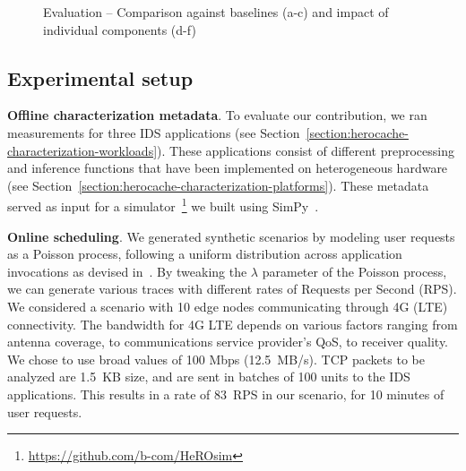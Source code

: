 \begin{figure}[t]
{    }
    \caption{Evaluation -- Comparison against baselines (a-c) and impact of individual components (d-f)}
    \label{figure:herocache-evaluation}
\end{figure}

\subsection{Experimental setup}


\textbf{Offline characterization metadata}. To evaluate our contribution, we ran measurements for three IDS applications (see Section~\ref{section:herocache-characterization-workloads}). These applications consist of different preprocessing and inference functions that have been implemented on heterogeneous hardware (see Section~\ref{section:herocache-characterization-platforms}). These metadata served as input for a simulator~\footnote{\href{https://github.com/b-com/HeROsim}{https://github.com/b-com/HeROsim}} we built using SimPy~\cite{simpy}.

\textbf{Online scheduling}.
We generated synthetic scenarios by modeling user requests as a Poisson process, following a uniform distribution across application invocations as devised in~\cite{9928755}. By tweaking the $\lambda$ parameter of the Poisson process, we can generate various traces with different rates of Requests per Second (RPS). We considered a scenario with 10 edge nodes communicating through 4G (LTE) connectivity. The bandwidth for 4G LTE depends on various factors ranging from antenna coverage, to communications service provider's QoS, to receiver quality. We chose to use broad values of 100 Mbps (12.5~MB/s). TCP packets to be analyzed are 1.5~KB size, and are sent in batches of 100 units to the IDS applications. This results in a rate of 83~RPS in our scenario, for 10 minutes of user requests. 

